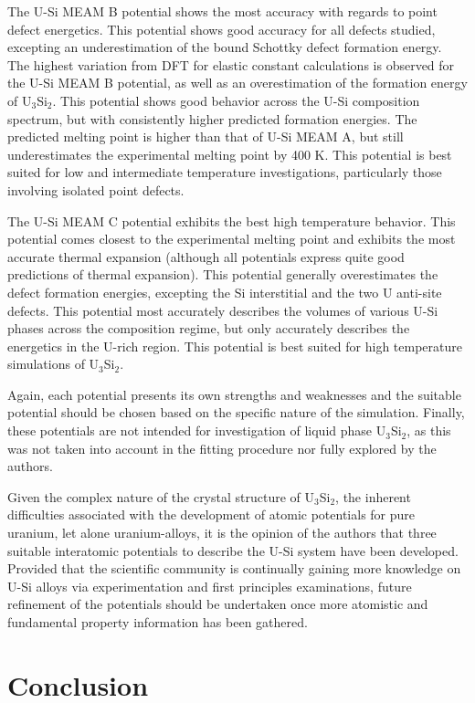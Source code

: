 \documentclass[review]{elsarticle}
\begin{document}
The U-Si MEAM B potential shows the most accuracy with regards to point defect energetics.  This potential shows good accuracy for all defects studied, excepting an underestimation of the bound Schottky defect formation energy.  The highest variation from DFT for elastic constant calculations is observed for the U-Si MEAM B potential, as well as an overestimation of the formation energy of U$_{3}$Si$_{2}$.  This potential shows good behavior across the U-Si composition spectrum, but with consistently higher predicted formation energies.  The predicted melting point is higher than that of U-Si MEAM A, but still underestimates the experimental melting point by 400 K.  This potential is best suited for low and intermediate temperature investigations, particularly those involving isolated point defects.  

The U-Si MEAM C potential exhibits the best high temperature behavior.  This potential comes closest to the experimental melting point and exhibits the most accurate thermal expansion (although all potentials express quite good predictions of thermal expansion).  This potential generally overestimates the defect formation energies, excepting the Si interstitial and the two U anti-site defects.  This potential most accurately describes the volumes of various U-Si phases across the composition regime, but only accurately describes the energetics in the U-rich region.  This potential is best suited for high temperature simulations of U$_{3}$Si$_{2}$.  

Again, each potential presents its own strengths and weaknesses and the suitable potential should be chosen based on the specific nature of the simulation.  Finally, these potentials are not intended for investigation of liquid phase U$_{3}$Si$_{2}$, as this was not taken into account in the fitting procedure nor fully explored by the authors.  

Given the complex nature of the crystal structure of U$_{3}$Si$_{2}$, the inherent difficulties associated with the development of atomic potentials for pure uranium, let alone uranium-alloys, it is the opinion of the authors that three suitable interatomic potentials to describe the U-Si system have been developed.  Provided that the scientific community is continually gaining more knowledge on U-Si alloys via experimentation and first principles examinations, future refinement of the potentials should be undertaken once more atomistic and fundamental property information has been gathered.  

\section{Conclusion}
\end{document}
